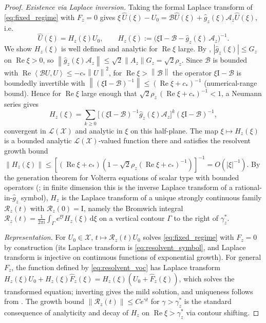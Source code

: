 \documentclass[11pt]{article}
\theoremstyle{plain}
\theoremstyle{definition}
\theoremstyle{remark}
\newcommand{\X}{\mathcal{X}}
\newcommand{\Bop}{\mathcal{B}}
\newcommand{\Lop}{\mathcal{L}}
\newcommand{\Res}{\mathcal{R}}
\newcommand{\re}{\operatorname{Re}}
\newcommand{\norm}[1]{\left\lVert #1 \right\rVert}
\newcommand{\abs}[1]{\left\lvert #1 \right\rvert}
\newcommand{\inner}[2]{\left\langle #1, #2 \right\rangle}
\newcommand{\dd}{\mathrm{d}}
\newcommand{\Laplace}{\widehat}
\newcommand{\branch}{\rho}
\newcommand{\id}{\mathrm{I}}
\begin{document}
\begin{proof}
\emph{Existence via Laplace inversion.} Taking the formal Laplace transform of
\eqref{eq:fixed_regime} with $F_z=0$ gives
$\xi\,\Laplace U(\xi)-U_0=\Bop\Laplace U(\xi)+\Laplace g_z(\xi)\mathcal{A}_z\Laplace U(\xi)$, i.e.
\begin{equation}
\label{eq:resolvent_symbol}
\Laplace U(\xi)=H_z(\xi)U_0,\qquad
H_z(\xi):=\big(\xi\id-\Bop-\Laplace g_z(\xi)\,\mathcal{A}_z\big)^{-1}.
\end{equation}
We show $H_z(\xi)$ is well defined and analytic for $\re\xi$ large. By ,
$\abs{\Laplace g_z(\xi)}\le G_z$ on $\re\xi>0$, so $\norm{\Laplace g_z(\xi)\mathcal{A}_z}\le
\sqrt2\norm{A_z}G_z=\sqrt2\branch_z$. Since $\Bop$ is bounded with
$\re\inner{\Bop U}{U}\le-c_\ast\norm U^2$, for $\re\xi>\norm{\Bop}$ the operator
$\xi\id-\Bop$ is boundedly invertible with $\norm{(\xi\id-\Bop)^{-1}}\le(\re\xi+c_\ast)^{-1}$
(numerical-range bound). Hence for $\re\xi$ large enough that
$\sqrt2\branch_z\,(\re\xi+c_\ast)^{-1}<1$, a Neumann series gives
\begin{equation}
\label{eq:neumann}
H_z(\xi)=\sum_{k\ge0}\big[(\xi\id-\Bop)^{-1}\Laplace g_z(\xi)\mathcal{A}_z\big]^k(\xi\id-\Bop)^{-1},
\end{equation}
convergent in $\Lop(\X)$ and analytic in $\xi$ on this half-plane. The map $\xi\mapsto H_z(\xi)$
is a bounded analytic $\Lop(\X)$-valued function there and satisfies the resolvent growth bound
$\norm{H_z(\xi)}\le[(\re\xi+c_\ast)(1-\sqrt2\branch_z(\re\xi+c_\ast)^{-1})]^{-1}=O(\abs\xi^{-1})$.
By the generation theorem for Volterra equations of scalar type with bounded operators
(\cite[Ch.~I]{pruss1993evolution}; in finite dimension this is the inverse Laplace transform of a
rational-in-$\Laplace g_z$ symbol), $H_z$ is the Laplace transform of a unique strongly continuous
family $\Res_z(t)$ with $\Res_z(0)=\id$, namely the Bromwich integral
$\Res_z(t)=\frac1{2\pi i}\int_{\Gamma}e^{\xi t}H_z(\xi)\,\dd\xi$ on a vertical contour $\Gamma$ to
the right of $\gamma_z^\ast$.

\emph{Representation.} For $U_0\in\X$, $t\mapsto\Res_z(t)U_0$ solves \eqref{eq:fixed_regime} with
$F_z=0$ by construction (its Laplace transform is \eqref{eq:resolvent_symbol}, and Laplace
transform is injective on continuous functions of exponential growth). For general $F_z$, the
function defined by \eqref{eq:resolvent_voc} has Laplace transform
$H_z(\xi)U_0+H_z(\xi)\Laplace F_z(\xi)=H_z(\xi)(U_0+\Laplace F_z(\xi))$, which solves the
transformed equation; inverting gives the mild solution, and uniqueness follows from
. The growth bound $\norm{\Res_z(t)}\le Ce^{\gamma t}$ for $\gamma>\gamma_z^\ast$
is the standard consequence of analyticity and decay of $H_z$ on $\re\xi>\gamma_z^\ast$ via contour
shifting.
\end{proof}
\end{document}
